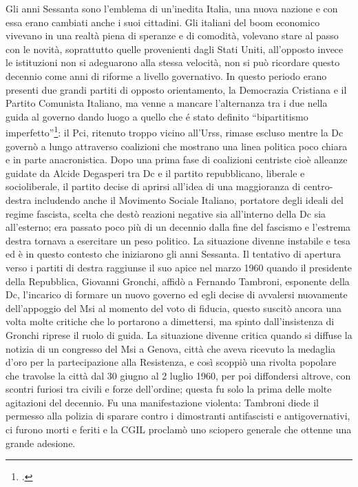 Gli anni Sessanta sono l'emblema di un'inedita Italia, una nuova nazione e con essa erano cambiati anche i suoi cittadini.
Gli italiani del boom economico vivevano in una realtà piena di speranze e di comodità, volevano stare al passo con le novità, soprattutto quelle provenienti dagli Stati Uniti, all'opposto invece le istituzioni non si adeguarono alla stessa velocità, non si può ricordare questo decennio come anni di riforme a livello governativo.
In questo periodo erano presenti due grandi partiti di opposto orientamento, la Democrazia Cristiana e il Partito Comunista Italiano, ma venne a mancare l'alternanza tra i due nella guida al governo dando luogo a quello che é stato definito \enquote{bipartitismo imperfetto}\footcite{Banti2}: il Pci, ritenuto troppo vicino all'Urss, rimase escluso mentre la Dc governò a lungo attraverso coalizioni che mostrano una linea politica poco chiara e in parte anacronistica.
Dopo una prima fase di coalizioni centriste cioè alleanze guidate da Alcide Degasperi tra Dc e il partito repubblicano, liberale e socioliberale, il partito decise di aprirsi all'idea di una maggioranza di centro-destra includendo anche il Movimento Sociale Italiano, portatore degli ideali del regime fascista, scelta che destò reazioni negative sia all'interno della Dc sia all'esterno; era passato poco più di un decennio dalla fine del fascismo e l'estrema destra tornava a esercitare un peso politico. 
La situazione divenne instabile e tesa ed è in questo contesto che iniziarono gli anni Sessanta.
Il tentativo di apertura verso i partiti di destra raggiunse il suo apice nel marzo 1960 quando il presidente della Repubblica, Giovanni Gronchi, affidò a Fernando Tambroni, esponente della Dc, l'incarico di formare un nuovo governo ed egli decise di avvalersi nuovamente dell'appoggio del Msi al momento del voto di fiducia, questo suscitò ancora una volta molte critiche che lo portarono a dimettersi, ma spinto dall'insistenza di Gronchi riprese il ruolo di guida.
La situazione divenne critica quando si diffuse la notizia di un congresso del Msi a Genova, città che aveva ricevuto la medaglia d'oro per la partecipazione alla Resistenza, e così scoppiò una rivolta popolare che travolse la città dal 30 giugno al 2 luglio 1960, per poi diffondersi altrove, con scontri furiosi tra civili e forze dell'ordine; questa fu solo la prima delle molte agitazioni del decennio.
Fu una manifestazione violenta: Tambroni diede il permesso alla polizia di sparare contro i dimostranti antifascisti e antigovernativi, ci furono morti e feriti e la CGIL proclamò uno sciopero generale che ottenne una grande adesione.
